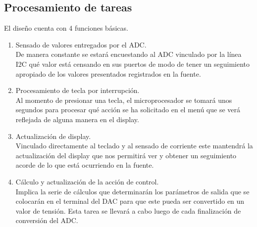\subsection{Procesamiento de tareas}
El diseño cuenta con 4 funciones básicas.
\begin{enumerate}
    \item Sensado de valores entregados por el ADC.\\
    De manera constante se estará encuestando al ADC vinculado por la línea I2C qué valor está censando en sus puertos de modo de tener un seguimiento apropiado de los valores presentados registrados en la fuente.    
    \item Procesamiento de tecla por interrupción.\\
    Al momento de presionar una tecla, el microprocesador se tomará unos segundos para procesar qué acción se ha solicitado en el menú que se verá reflejada de alguna manera en el display.
    \item Actualización de display.\\
    Vinculado directamente al teclado y al sensado de corriente este mantendrá la actualización del display que nos permitirá ver y obtener un seguimiento acorde de lo que está ocurriendo en la fuente.
    \item Cálculo y actualización de la acción de control.\\
    Implica la serie de cálculos que determinarán los parámetros de salida que se colocarán en el terminal del DAC para que este pueda ser convertido en un valor de tensión. Esta tarea se llevará a cabo luego de cada finalización de conversión del ADC.
\end{enumerate}

